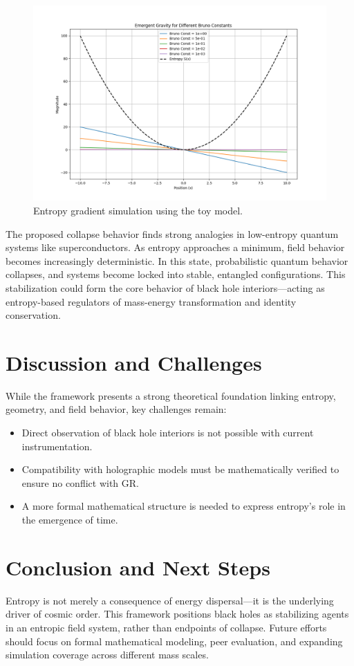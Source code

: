 \documentclass[12pt]{article}
\begin{document}
\begin{figure}[H]
\centering
\includegraphics[width=0.75\linewidth]{fig_06_toy_model_entropy.png}
\caption{Entropy gradient simulation using the toy model.}
\label{fig_06_toy_model_entropy}
\end{figure}


The proposed collapse behavior finds strong analogies in low-entropy quantum systems like superconductors. As entropy approaches a minimum, field behavior becomes increasingly deterministic. In this state, probabilistic quantum behavior collapses, and systems become locked into stable, entangled configurations. This stabilization could form the core behavior of black hole interiors—acting as entropy-based regulators of mass-energy transformation and identity conservation.

\section{Discussion and Challenges}
While the framework presents a strong theoretical foundation linking entropy, geometry, and field behavior, key challenges remain:
\begin{itemize}
    \item Direct observation of black hole interiors is not possible with current instrumentation.
    \item Compatibility with holographic models must be mathematically verified to ensure no conflict with GR.
    \item A more formal mathematical structure is needed to express entropy's role in the emergence of time.
\end{itemize}

\section{Conclusion and Next Steps}
Entropy is not merely a consequence of energy dispersal—it is the underlying driver of cosmic order. This framework positions black holes as stabilizing agents in an entropic field system, rather than endpoints of collapse. Future efforts should focus on formal mathematical modeling, peer evaluation, and expanding simulation coverage across different mass scales.
\end{document}
